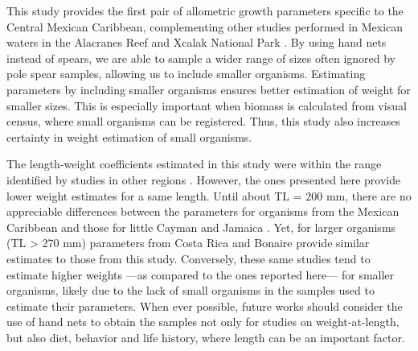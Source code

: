 \documentclass[fleqn,10pt,lineno]{wlpeerj} %
\theoremstyle{definition}
\theoremstyle{definition}
\theoremstyle{definition}
\theoremstyle{remark}
\begin{document}
This study provides the first pair of allometric growth parameters
specific to the Central Mexican Caribbean, complementing other studies
performed in Mexican waters in the Alacranes Reef
\citep{aguilarperera_2016} and Xcalak National Park
\citep{sabidoitza_2016}. By using hand nets instead of spears, we are
able to sample a wider range of sizes often ignored by pole spear
samples, allowing us to include smaller organisms. Estimating parameters
by including smaller organisms ensures better estimation of weight for
smaller sizes. This is especially important when biomass is calculated
from visual census, where small organisms can be registered. Thus, this
study also increases certainty in weight estimation of small organisms.

The length-weight coefficients estimated in this study were within the
range identified by studies in other regions
\citep{barbour_2011,fogg_2013,aguilarperera_2016,sabidoitza_2016,edwards_2014,chin_2016,deleon_2013,sandel_2015}.
However, the ones presented here provide lower weight estimates for a
same length. Until about TL = 200 mm, there are no appreciable
differences between the parameters for organisms from the Mexican
Caribbean and those for little Cayman \citep{edwards_2014} and Jamaica
\citep{chin_2016}. Yet, for larger organisms (TL \textgreater{} 270 mm)
parameters from Costa Rica \citep{sandel_2015} and Bonaire
\citep{deleon_2013} provide similar estimates to those from this study.
Conversely, these same studies tend to estimate higher weights ---as
compared to the ones reported here--- for smaller organisms, likely due
to the lack of small organisms in the samples used to estimate their
parameters. When ever possible, future works should consider the use of
hand nets to obtain the samples not only for studies on
weight-at-length, but also diet, behavior and life history, where length
can be an important factor.
\end{document}
